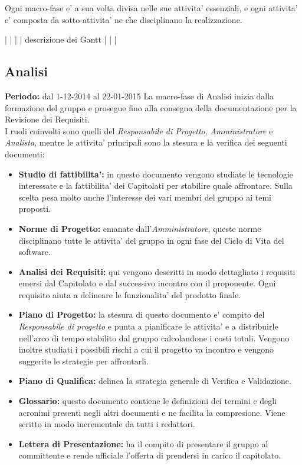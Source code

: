 Ogni macro-fase e' a sua volta divisa nelle sue attivita' essenziali, e ogni attivita' e' composta da sotto-attivita' ne che disciplinano la realizzazione.

|
|
|
|  descrizione dei Gantt
|
|
|


\subsection{Analisi}
\textbf{Periodo:} dal 1-12-2014 al 22-01-2015
La macro-fase di Analisi inizia dalla formazione del gruppo e prosegue fino alla consegna della documentazione per la Revisione dei Requisiti. \\
I ruoli coinvolti sono quelli del \textit{Responsabile di Progetto}, \textit{Amministratore} e \textit{Analista}, mentre le attivita' principali sono la stesura e la verifica dei seguenti documenti:

\begin{itemize}
\item \textbf{Studio di fattibilita':} in questo documento vengono studiate le tecnologie interessate e la fattibilita' dei Capitolati per stabilire quale affrontare. Sulla scelta pesa molto anche l'interesse dei vari membri del gruppo ai temi proposti.
\item \textbf{Norme di Progetto:} emanate dall'\textit{Amministratore}, queste norme disciplinano tutte le attivita' del gruppo in ogni fase del Ciclo di Vita del software.
\item \textbf{Analisi dei Requisiti:} qui vengono descritti in modo dettagliato i requisiti emersi dal Capitolato e dal successivo incontro con il proponente. Ogni requisito aiuta a delineare le funzionalita' del prodotto finale.
\item \textbf{Piano di Progetto:} la stesura di questo documento e' compito del \textit{Responsabile di progetto} e punta a pianificare le attivita' e a distribuirle nell'arco di tempo stabilito dal gruppo calcolandone i costi totali. Vengono inoltre studiati i possibili rischi a cui il progetto va incontro e vengono suggerite le strategie per affrontarli.
\item \textbf{Piano di Qualifica:} delinea la strategia generale di Verifica e Validazione.
\item \textbf{Glossario:} questo documento contiene le definizioni dei termini e degli acronimi presenti negli altri documenti e ne facilita la compresione. Viene scritto in modo incrementale da tutti i redattori.
\item \textbf{Lettera di Presentazione:} ha il compito di presentare il gruppo al committente e rende ufficiale l'offerta di prendersi in carico il capitolato.
\end{itemize}

